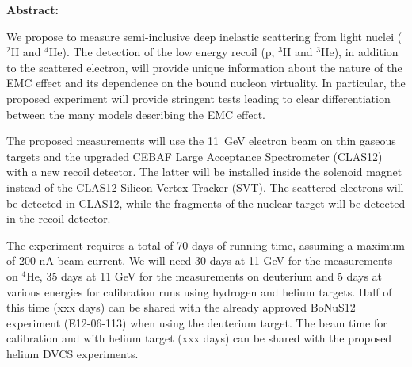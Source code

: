 {\large\textbf{Abstract:}}

We propose to measure semi-inclusive deep inelastic scattering from light nuclei ($^2$H and $^4$He). The detection of the low energy recoil (p, $^3$H and $^3$He), in addition to the scattered electron, will provide unique information about the nature of the EMC effect and its dependence on the bound nucleon virtuality. In particular, the proposed experiment will provide stringent tests leading to clear differentiation between the many models describing the EMC effect.

The proposed measurements will use the 11~GeV electron beam on thin gaseous targets and the upgraded CEBAF Large Acceptance Spectrometer (CLAS12) with a new recoil detector. The latter will be installed inside the solenoid magnet instead of the CLAS12 Silicon Vertex Tracker (SVT). The scattered electrons will be detected in CLAS12, while the fragments of the nuclear target will be detected in the recoil detector. 

The experiment requires a total of 70 days of running time, assuming a maximum of 200 nA beam current. We will need 30 days at 11 GeV for the measurements on $^4$He, 35 days at 11 GeV for the measurements on deuterium and 5 days at various energies for calibration runs using hydrogen and helium targets. Half of this time (xxx days) can be shared with the already approved BoNuS12 experiment (E12-06-113) when using the deuterium target. The beam time for calibration and with helium target (xxx days) can be shared with the proposed helium DVCS experiments.


\newpage


